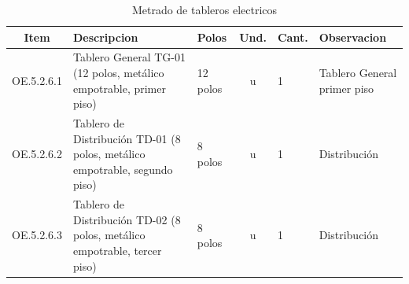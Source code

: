 \begin{table}[H]
\centering
\small
\caption{Metrado de tableros electricos}
\label{tab:metrado-tableros}
\begin{tabularx}{\textwidth}{c L{4.5cm} L{1.8cm} c L{1.8cm} Y}
\toprule
\textbf{Item} & \textbf{Descripcion} & \textbf{Polos} & \textbf{Und.} & \textbf{Cant.} & \textbf{Observacion} \\
\midrule
OE.5.2.6.1 & Tablero General TG-01 (12 polos, metálico empotrable, primer piso) & 12 polos & u & 1 & Tablero General primer piso \\
OE.5.2.6.2 & Tablero de Distribución TD-01 (8 polos, metálico empotrable, segundo piso) & 8 polos & u & 1 & Distribución \\
OE.5.2.6.3 & Tablero de Distribución TD-02 (8 polos, metálico empotrable, tercer piso) & 8 polos & u & 1 & Distribución \\
\bottomrule
\end{tabularx}
\end{table}
